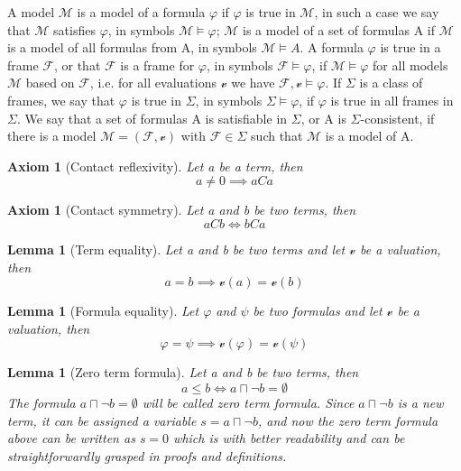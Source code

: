 \documentclass{article}
\newtheorem{lemma}[theorem]{Lemma}
\newtheorem{axiom}[theorem]{Axiom}
\begin{document}
A model $\mathcal{M}$ is a model of a formula $\varphi$ if $\varphi$ is true in $\mathcal{M}$, in such a case we say that $\mathcal{M}$ satisfies $\varphi$, in symbols $\mathcal{M} \models \varphi$;
$\mathcal{M}$ is a model of a set of formulas A if $\mathcal{M}$ is a model of all formulas from A, in symbols $\mathcal{M} \models A$. A formula $\varphi$ is true in a frame $\mathcal{F}$, or that $\mathcal{F}$ is a frame for $\varphi$, in symbols $\mathcal{F} \models \varphi$,
if $\mathcal{M} \models \varphi$ for all models $\mathcal{M}$ based on $\mathcal{F}$, i.e. for all evaluations $\mathscr{v}$ we have $\mathcal{F}, \mathscr{v} \models \varphi$.
If $\Sigma$ is a class of frames, we say that $\varphi$ is true in $\Sigma$, in symbols $\Sigma \models \varphi$, if $\varphi$ is true in all frames in $\Sigma$. We say that a set of 
formulas A is satisfiable in $\Sigma$, or A is $\Sigma$-consistent, if there is a model $\mathcal{M} = (\mathcal{F}, \mathscr{v})$ with $\mathcal{F} \in \Sigma$ such that $\mathcal{M}$
is a model of A.

\begin{axiom}[Contact reflexivity]
	Let a be a term, then
	\begin{equation*}
		a \neq 0 \implies aCa
	\end{equation*}
\end{axiom}

\begin{axiom}[Contact symmetry]
	Let a and b be two terms, then
	\begin{equation*}
		aCb \iff bCa
	\end{equation*}
\end{axiom}

\begin{lemma}[Term equality]
	Let a and b be two terms and let $\mathscr{v}$ be a valuation, then
	\begin{equation*}
		a = b \implies \mathscr{v}(a) = \mathscr{v}(b)
	\end{equation*}
\end{lemma}

\begin{lemma}[Formula equality]
	Let $\varphi$ and $\psi$ be two formulas and let $\mathscr{v}$ be a valuation, then
	\begin{equation*}
		\varphi = \psi \implies \mathscr{v}(\varphi) = \mathscr{v}(\psi)
	\end{equation*}
\end{lemma}

\begin{lemma}[Zero term formula]
	Let a and b be two terms, then
	\begin{equation*}
		a \le b \iff a \sqcap \neg b = \emptyset
	\end{equation*}
	The formula $a \sqcap \neg b = \emptyset$ will be called zero term formula.
	Since $a \sqcap \neg b$ is a new term, it can be assigned a variable $s = a \sqcap \neg b$, 
	and now the zero term formula above can be written as $s  = 0$ which is with better readability and 
	can be straightforwardly grasped in proofs and definitions.
\end{lemma}
\end{document}
